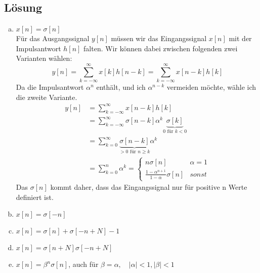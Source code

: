 \subsection*{Lösung}
	\begin{enumerate}[a)]
		\item $x[n]=\sigma [n]$ \\
			Für das Ausgangssignal $y[n]$ müssen wir das Eingangssignal $x[n]$ mit der Impulsantwort $h[n]$ falten. Wir können dabei zwischen folgenden zwei Varianten wählen:
			\[
				y[n] = \sum_{k=-\infty}^{\infty}x[k]h[n-k]=\sum_{k=-\infty}^{\infty}x[n-k]h[k]
			\]
			Da die Impulsantwort $\alpha ^n$ enthält, und ich $\alpha ^{n-k}$ vermeiden möchte, wähle ich die zweite Variante.
			\begin{align*}
				y[n]	&= \sum_{k=-\infty}^{\infty}x[n-k]h[k] \\
						&= \sum_{k=-\infty}^{\infty}\sigma [n-k] \alpha ^k \underbrace{\sigma [k]}_{0 \text{ für } k<0} \\
						&= \sum_{k=0}^{\infty}\underbrace{\sigma [n-k]}_{>0 \text{ für } n \ge k} \alpha ^k \\
						&= \sum_{k=0}^{n} \alpha ^k = \left\{ \begin{array}{ll} n\sigma [n] & \alpha=1\\ \frac{1-\alpha^{n+1}}{1-\alpha}\sigma [n] & sonst \end{array} \right.
			\end{align*}
			Das $\sigma [n]$ kommt daher, dass das Eingangssignal nur für positive n Werte definiert ist.
		\item $x[n]=\sigma [-n]$
		\item $x[n]=\sigma [n]+\sigma [-n+N]-1$
		\item $x[n]=\sigma [n+N]\sigma [-n+N]$
		\item $x[n]=\beta ^n \sigma [n]$, auch für $\beta = \alpha, \quad |\alpha|<1, |\beta| < 1$
	\end{enumerate}
